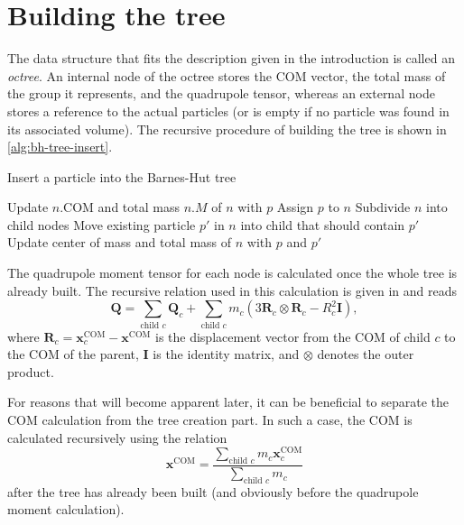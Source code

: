 \section{Building the tree} %
The data structure that fits the description given in the introduction is called an \textit{octree}.
An internal node of the octree stores the COM vector, the total mass of the group it represents, and the quadrupole tensor, whereas an external node stores a reference to the actual particles (or is empty if no particle was found in its associated volume).
The recursive procedure of building the tree is shown in \autoref{alg:bh-tree-insert}.
\begin{algorithm}
    \caption{Insert a particle into the Barnes-Hut tree}\label{alg:bh-tree-insert}
    \begin{algorithmic}[1]
        \State Update $n.\textrm{COM}$ and total mass $n.M$ of $n$ with $p$
        \State {}
        \State Assign $p$ to $n$
        \Else {}
        \State Subdivide $n$ into child nodes
        \State Move existing particle $p'$ in $n$ into child that should contain $p'$
        \State Update center of mass and total mass of $n$ with $p$ and $p'$
        \State {}
        \EndIf
        \EndFunction
    \end{algorithmic}
\end{algorithm}
The quadrupole moment tensor for each node is calculated once the whole tree is already built.
The recursive relation used in this calculation is given in \cite{hernquist1987performance} and reads
\begin{equation*}
    \mathbf{Q} = \sum_{\text{child }c} \mathbf{Q}_c + \sum_{\text{child }c} m_c(3 \mathbf{R}_c \otimes \mathbf{R}_c - R_c^2 \mathbf{I}),
\end{equation*}
where $\mathbf{R}_c = \mathbf{x}^\text{COM}_c - \mathbf{x}^\text{COM}$ is the displacement vector from the COM of child $c$ to the COM of the parent, $\mathbf{I}$ is the identity matrix, and $\otimes$ denotes the outer product.

For reasons that will become apparent later, it can be beneficial to separate the COM calculation from the tree creation part.
In such a case, the COM is calculated recursively using the relation
\begin{equation}\label{eq:bh-com-calculation}
    \mathbf{x}^\text{COM} = \frac{\sum_{\text{child } c} m_c \mathbf{x}_c^\text{COM}}{\sum_{\text{child } c} m_c}
\end{equation}
after the tree has already been built (and obviously before the quadrupole moment calculation).
